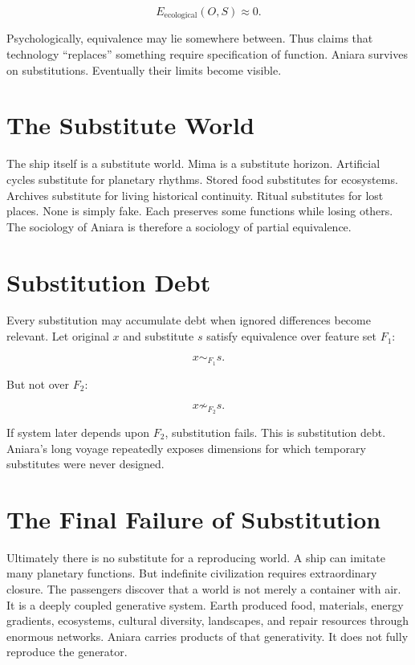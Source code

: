 \documentclass[11pt,oneside]{book}
\theoremstyle{definition}
\theoremstyle{remark}
\begin{document}
\[
E_{\mathrm{ecological}}(O,S)\approx0.
\]

Psychologically, equivalence may lie somewhere between. Thus claims that technology ``replaces''
something require specification of function. Aniara survives on substitutions. Eventually their
limits become visible.

\section{The Substitute World}

The ship itself is a substitute world. Mima is a substitute horizon. Artificial cycles substitute
for planetary rhythms. Stored food substitutes for ecosystems. Archives substitute for living
historical continuity. Ritual substitutes for lost places. None is simply fake. Each preserves some
functions while losing others. The sociology of Aniara is therefore a sociology of partial
equivalence.

\section{Substitution Debt}

Every substitution may accumulate debt when ignored differences become relevant. Let original \(x\)
and substitute \(s\) satisfy equivalence over feature set \(F_1\):

\[
x\sim_{F_1}s.
\]

But not over \(F_2\):

\[
x\not\sim_{F_2}s.
\]

If system later depends upon \(F_2\), substitution fails. This is substitution debt. Aniara's long
voyage repeatedly exposes dimensions for which temporary substitutes were never designed.

\section{The Final Failure of Substitution}

Ultimately there is no substitute for a reproducing world. A ship can imitate many planetary
functions. But indefinite civilization requires extraordinary closure. The passengers discover that
a world is not merely a container with air. It is a deeply coupled generative system. Earth produced
food, materials, energy gradients, ecosystems, cultural diversity, landscapes, and repair resources
through enormous networks. Aniara carries products of that generativity. It does not fully reproduce
the generator.
\end{document}
